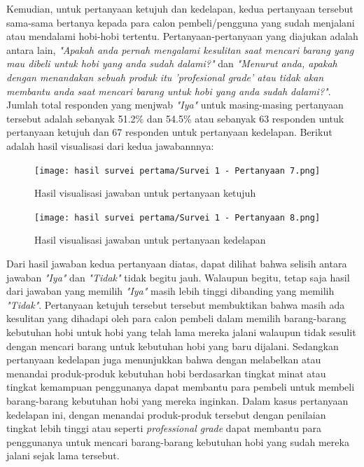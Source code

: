 \documentclass[a4paper]{article}
\begin{document}
Kemudian, untuk pertanyaan ketujuh dan kedelapan, kedua pertanyaan tersebut sama-sama bertanya kepada para calon pembeli/pengguna yang sudah menjalani atau mendalami hobi-hobi tertentu. Pertanyaan-pertanyaan yang diajukan adalah antara lain, \textit{"Apakah anda pernah mengalami kesulitan saat mencari barang yang mau dibeli untuk hobi yang anda sudah dalami?"} dan \textit{"Menurut anda, apakah dengan menandakan sebuah produk itu 'profesional grade' atau tidak akan membantu anda saat mencari barang untuk hobi yang anda sudah dalami?"}. Jumlah total responden yang menjwab \textit{"Iya"} untuk masing-masing pertanyaan tersebut adalah sebanyak 51.2\% dan 54.5\% atau sebanyak 63 responden untuk pertanyaan ketujuh dan 67 responden untuk pertanyaan kedelapan. Berikut adalah hasil visualisasi dari kedua jawabannnya:

\begin{figure}[h]
    \centering
    \texttt{[image: hasil survei pertama/Survei 1 - Pertanyaan 7.png]}
    \caption{Hasil visualisasi jawaban untuk pertanyaan ketujuh}
\end{figure}
\newpage
\begin{figure}[h]
    \centering
    \texttt{[image: hasil survei pertama/Survei 1 - Pertanyaan 8.png]}
    \caption{Hasil visualisasi jawaban untuk pertanyaan kedelapan}
\end{figure}

Dari hasil jawaban kedua pertanyaan diatas, dapat dilihat bahwa selisih antara jawaban \textit{"Iya"} dan \textit{"Tidak"} tidak begitu jauh. Walaupun begitu, tetap saja hasil dari jawaban yang memilih \textit{"Iya"} masih lebih tinggi dibanding yang memilih \textit{"Tidak"}. Pertanyaan ketujuh tersebut tersebut membuktikan bahwa masih ada kesulitan yang dihadapi oleh para calon pembeli dalam memilih barang-barang kebutuhan hobi untuk hobi yang telah lama mereka jalani walaupun tidak sesulit dengan mencari barang untuk kebutuhan hobi yang baru dijalani. Sedangkan pertanyaan kedelapan juga menunjukkan bahwa dengan melabelkan atau menandai produk-produk kebutuhan hobi berdasarkan tingkat minat atau tingkat kemampuan penggunanya dapat membantu para pembeli untuk membeli barang-barang kebutuhan hobi yang mereka inginkan. Dalam kasus pertanyaan kedelapan ini, dengan menandai produk-produk tersebut dengan penilaian tingkat lebih tinggi atau seperti \textit{professional grade} dapat membantu para penggunanya untuk mencari barang-barang kebutuhan hobi yang sudah mereka jalani sejak lama tersebut.
\end{document}
